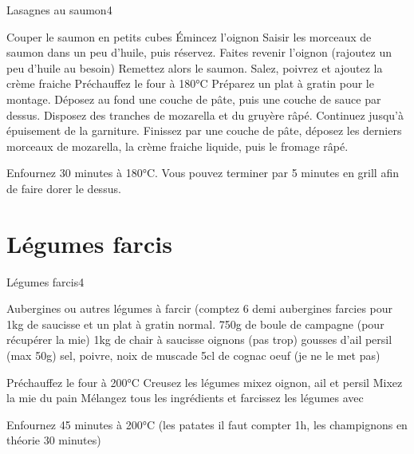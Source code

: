 {\begin{recette}{Lasagnes au saumon}{4}{}{}
\begin{preparation}
\etape Couper le saumon en petits cubes
\etape Émincez l'oignon
\etape Saisir les morceaux de saumon dans un peu d'huile, puis réservez.
\etape Faites revenir l'oignon (rajoutez un peu d'huile au besoin)
\etape Remettez alors le saumon. Salez, poivrez et ajoutez la crème fraiche
\etape Préchauffez le four à 180°C
\etape Préparez un plat à gratin pour le montage. Déposez au fond une couche de pâte, puis une couche de sauce par dessus. 
Disposez des tranches de mozarella et du gruyère râpé. Continuez jusqu'à épuisement de la garniture. 
\etape Finissez par une couche de pâte, déposez les derniers morceaux de mozarella, la crème fraiche liquide, puis le fromage 
râpé. 
\end{preparation}

\begin{cuisson}
Enfournez 30 minutes à 180°C. Vous pouvez terminer par 5 minutes en grill afin de faire dorer le dessus.
\end{cuisson}
\end{recette}

\section{Légumes farcis}
\begin{recette}{Légumes farcis}{4}{}{}
\begin{ingredients}
\ingredient Aubergines ou autres légumes à farcir (comptez 6 demi aubergines farcies pour 1kg de saucisse et un plat à gratin normal.
\ingredient[Farce]
\ingredient 750g de boule de campagne (pour récupérer la mie)
\ingredient 1kg de chair à saucisse
 oignons (pas trop)
 gousses d'ail
\ingredient persil (max 50g)
\ingredient sel, poivre, noix de muscade
\ingredient 5cl de cognac
 oeuf (je ne le met pas)
\end{ingredients}

\begin{preparation}
\etape Préchauffez le four à 200°C
\etape Creusez les légumes
\etape mixez oignon, ail et persil
\etape Mixez la mie du pain
\etape Mélangez tous les ingrédients et farcissez les légumes avec
\end{preparation}

\begin{cuisson}
Enfournez 45 minutes à 200°C (les patates il faut compter 1h, les champignons en théorie 30 minutes)
\end{cuisson}
\end{recette}

}
